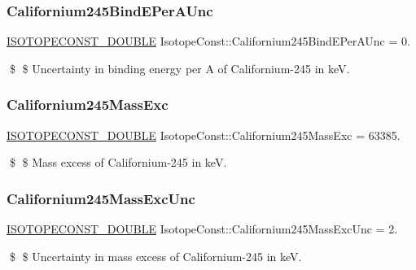 \subsubsection{\texorpdfstring{Californium245\+Bind\+E\+Per\+A\+Unc}{Californium245BindEPerAUnc}}
{\footnotesize\ttfamily \mbox{\hyperlink{group___isotope_const-_macros_ga8f45a7272ce02c0b4c65c44636ed719a}{I\+S\+O\+T\+O\+P\+E\+C\+O\+N\+S\+T\+\_\+\+D\+O\+U\+B\+LE}} Isotope\+Const\+::\+Californium245\+Bind\+E\+Per\+A\+Unc = 0.}

\$ \$ Uncertainty in binding energy per A of Californium-\/245 in keV. \mbox{\label{group___isotope_const-_californium-_cf245_ga882d6a02e1aef29cd74207747fc8dd27}} 
\subsubsection{\texorpdfstring{Californium245\+Mass\+Exc}{Californium245MassExc}}
{\footnotesize\ttfamily \mbox{\hyperlink{group___isotope_const-_macros_ga8f45a7272ce02c0b4c65c44636ed719a}{I\+S\+O\+T\+O\+P\+E\+C\+O\+N\+S\+T\+\_\+\+D\+O\+U\+B\+LE}} Isotope\+Const\+::\+Californium245\+Mass\+Exc = 63385.}

\$ \$ Mass excess of Californium-\/245 in keV. \mbox{\label{group___isotope_const-_californium-_cf245_gab387bd4f53d0e346ab8229b00a871247}} 
\subsubsection{\texorpdfstring{Californium245\+Mass\+Exc\+Unc}{Californium245MassExcUnc}}
{\footnotesize\ttfamily \mbox{\hyperlink{group___isotope_const-_macros_ga8f45a7272ce02c0b4c65c44636ed719a}{I\+S\+O\+T\+O\+P\+E\+C\+O\+N\+S\+T\+\_\+\+D\+O\+U\+B\+LE}} Isotope\+Const\+::\+Californium245\+Mass\+Exc\+Unc = 2.}

\$ \$ Uncertainty in mass excess of Californium-\/245 in keV. \mbox{\label{group___isotope_const-_californium-_cf245_ga6d9d6a7839268c21784db82aaeb62b6c}} 
